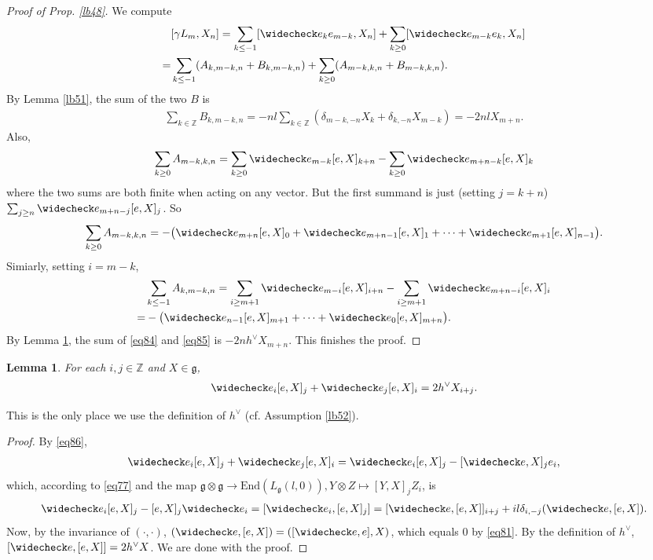 \documentclass[11pt,b5paper,notitlepage]{article}
\theoremstyle{definition}
\theoremstyle{plain}
\newtheorem{lm}[df]{Lemma}
\newcommand{\wch}{\widecheck}
\newcommand{\End}{\mathrm{End}} %
\newcommand{\gk}{\mathfrak g}
\newcommand{\Zbb}{\mathbb Z}
\numberwithin{equation}{section}
\begin{document}
\begin{proof}[Proof of Prop. \ref{lb48}]
We compute
\begin{align*}
&[\gamma L_m,X_n]=\sum_{k\leq-1}[\wch e_ke_{m-k},X_n]+\sum_{k\geq0}[\wch e_{m-k}e_k,X_n]\\
=&\sum_{k\leq-1}(A_{k,m-k,n}+B_{k,m-k,n})+\sum_{k\geq0}(A_{m-k,k,n}+B_{m-k,k,n}).	
\end{align*}
By Lemma \ref{lb51}, the sum of the two  $B$ is
\begin{align*}
\sum_{k\in\Zbb}B_{k,m-k,n}=-nl\sum_{k\in\Zbb} (\delta_{m-k,-n}X_k+\delta_{k,-n}X_{m-k})=-2nl X_{m+n}.
\end{align*}
Also,
\begin{align*}
\sum_{k\geq 0}A_{m-k,k,n}=\sum_{k\geq0}\wch e_{m-k}[e,X]_{k+n}-\sum_{k\geq 0}\wch e_{m+n-k}[e,X]_k	
\end{align*}
where the two sums are both finite when acting on any vector. But the first summand is just (setting $j=k+n$) $\sum_{j\geq n}\wch e_{m+n-j}[e,X]_j$. So
\begin{align}
\sum_{k\geq 0}A_{m-k,k,n}=-\big(\wch e_{m+n}[e,X]_0+\wch e_{m+n-1}[e,X]_1+\cdots+\wch e_{m+1}[e,X]_{n-1}\big).	\label{eq84}
\end{align}
Simiarly, setting $i=m-k$,
\begin{align}
&\sum_{k\leq-1}A_{k,m-k,n}=\sum_{i\geq m+1}\wch e_{m-i}[e,X]_{i+n}-\sum_{i\geq m+1}\wch e_{m+n-i}[e,X]_i\nonumber\\
=&-\big(\wch e_{n-1}[e,X]_{m+1}+\cdots+\wch e_0[e,X]_{m+n} \big).	\label{eq85}
\end{align}
By Lemma \ref{lb53}, the sum of \eqref{eq84} and \eqref{eq85} is $-2nh^\vee X_{m+n}$. This finishes the proof.
\end{proof}


\begin{lm}\label{lb53}
For each $i,j\in\Zbb$ and $X\in\gk$,
\begin{align}
\wch e_i[e,X]_j+\wch e_j[e,X]_i=2h^\vee X_{i+j}.	
\end{align}
\end{lm}
This is the only place we use the definition of $h^\vee$ (cf. Assumption \ref{lb52}).

\begin{proof}
By \eqref{eq86},
\begin{align*}
\wch e_i[e,X]_j+\wch e_j[e,X]_i=\wch e_i[e,X]_j-[\wch e,X]_je_i,	
\end{align*}
which, according to \eqref{eq77} and the map $\gk\otimes\gk\rightarrow\End(L_\gk(l,0)),Y\otimes Z\mapsto [Y,X]_jZ_i$, is
\begin{align*}
\wch e_i[e,X]_j-[e,X]_j \wch e_i=[\wch e_i,[e,X]_j]=[\wch e,[e,X]]_{i+j}+il\delta_{i,-j}(\wch e,[e,X]).
\end{align*}
Now, by the invariance of $(\cdot,\cdot)$, $(\wch e,[e,X])=([\wch e,e],X)$, which equals $0$ by \eqref{eq81}. By the definition of $h^\vee$, $[\wch e,[e,X]]=2h^\vee X$. We are done with the proof.
\end{proof}
\end{document}
